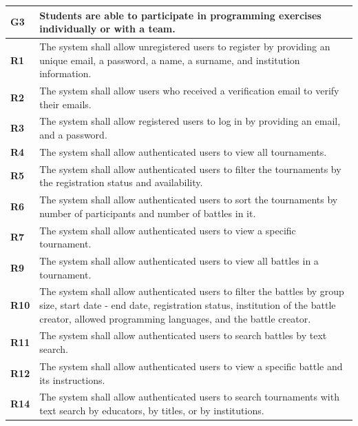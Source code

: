 \begin{table}[h!]
  \centering
  \begin{tabular}{lp{15cm}}
    \hline
    \textbf{G3} & Students are able to participate in programming exercises individually or with a team. \\
    \hline
    \hline
    \textbf{R1} & The system shall allow unregistered users to register by providing an unique email, a password, a name, a surname, and institution information. \\

    \textbf{R2} & The system shall allow users who received a verification email to verify their emails. \\

    \textbf{R3} & The system shall allow registered users to log in by providing an email, and a password. \\

    \textbf{R4} & The system shall allow authenticated users to view all tournaments. \\
     
     \textbf{R5} & The system shall allow authenticated users to filter the tournaments by the registration status and availability. \\

    \textbf{R6} & The system shall allow authenticated users to sort the tournaments by number of participants and number of battles in it. \\

    \textbf{R7} & The system shall allow authenticated users to view a specific tournament. \\

\textbf{R9} & The system shall allow authenticated users to view all battles in a tournament. \\
\textbf{R10} & The system shall allow authenticated users to filter the battles by group size, start date - end date, registration status, institution of the battle creator, allowed programming languages, and the battle creator. \\
\textbf{R11} &  The system shall allow authenticated users to search battles by text search. \\
\textbf{R12} &  The system shall allow authenticated users to view a specific battle and its instructions.\\
\textbf{R14} &  The system shall allow authenticated users to search tournaments with text search by educators, by titles, or by institutions.\\



\end{tabular}
\end{table}
